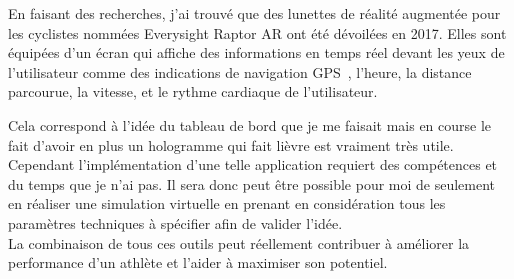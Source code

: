 En faisant des recherches, j'ai trouvé que des lunettes de réalité augmentée pour les cyclistes nommées Everysight Raptor AR ont été dévoilées en 2017. Elles sont équipées d'un écran qui affiche des informations en temps réel  devant les yeux de l'utilisateur comme des indications de navigation GPS , l’heure, la distance parcourue, la vitesse, et le rythme cardiaque de l’utilisateur. 

Cela correspond à l'idée du tableau de bord que  je me faisait mais en course le fait d'avoir en plus un hologramme qui fait lièvre est vraiment très utile. Cependant l'implémentation d'une telle application requiert des compétences et du temps que je n'ai pas. Il sera donc peut être possible pour moi de seulement en réaliser une simulation virtuelle en prenant en considération tous les paramètres techniques à spécifier afin de valider l'idée.\\


La combinaison de tous ces outils peut réellement contribuer à améliorer la performance d'un athlète et l'aider à maximiser son potentiel.\\


        
